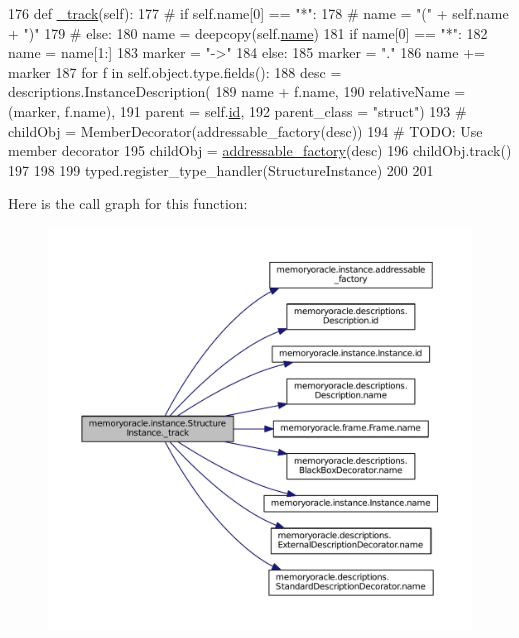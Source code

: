 \begin{DoxyCode}
176     \textcolor{keyword}{def }\hyperlink{classmemoryoracle_1_1instance_1_1StructureInstance_a972b88ba2dcdc0e5d362d92e740f446d}{\_track}(self):
177         \textcolor{comment}{# if self.name[0] == "*":}
178         \textcolor{comment}{#     name = "(" + self.name + ")"}
179         \textcolor{comment}{# else:}
180         name = deepcopy(self.\hyperlink{classmemoryoracle_1_1instance_1_1Instance_a87024af86578f01672682bfaa5c82d8c}{name})
181         \textcolor{keywordflow}{if} name[0] == \textcolor{stringliteral}{"*"}:
182             name = name[1:]
183             marker = \textcolor{stringliteral}{"->"}
184         \textcolor{keywordflow}{else}:
185             marker = \textcolor{stringliteral}{"."}
186         name += marker
187         \textcolor{keywordflow}{for} f \textcolor{keywordflow}{in} self.object.type.fields():
188             desc = descriptions.InstanceDescription(
189                     name + f.name,
190                     relativeName = (marker, f.name),
191                     parent = self.\hyperlink{classmemoryoracle_1_1instance_1_1Instance_a94bd2b9c1a7739801bc9938e86034652}{id},
192                     parent\_class = \textcolor{stringliteral}{"struct"})
193             \textcolor{comment}{# childObj = MemberDecorator(addressable\_factory(desc))}
194             \textcolor{comment}{# TODO: Use member decorator}
195             childObj = \hyperlink{namespacememoryoracle_1_1instance_ac651a8635b1ae2ee7e788bf9adb17a0b}{addressable\_factory}(desc)
196             childObj.track()
197 
198 
199 typed.register\_type\_handler(StructureInstance)
200 
201 
\end{DoxyCode}


Here is the call graph for this function\+:\nopagebreak
\begin{figure}[H]
\begin{center}
\leavevmode
\includegraphics[width=350pt]{classmemoryoracle_1_1instance_1_1StructureInstance_a972b88ba2dcdc0e5d362d92e740f446d_cgraph}
\end{center}
\end{figure}




